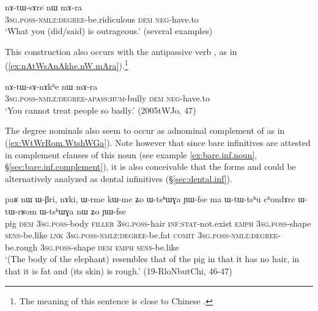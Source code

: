 \begin{exe}
\ex \label{ex:nAtWsAre.nW.mAra}
\gll  nɤ-tɯ-sɤre nɯ mɤ-ra \\
\textsc{3sg}.\textsc{poss}-\textsc{nmlz}:\textsc{degree}-be.ridiculous \textsc{dem} \textsc{neg}-have.to \\
\glt `What you (did/said) is outrageous.' (several examples)
\end{exe}

This construction also occurs with the antipassive verb , as in (\ref{ex:nAtWsAnAkhe.nW.mAra}).\footnote{The meaning of this sentence is close to Chinese .
}

\begin{exe}
\ex \label{ex:nAtWsAnAkhe.nW.mAra}
\gll nɤ-tɯ-sɤ-nɤkʰe nɯ mɤ-ra \\
\textsc{3sg}.\textsc{poss}-\textsc{nmlz}:\textsc{degree}-\textsc{apass}:\textsc{hum}-bully \textsc{dem} \textsc{neg}-have.to \\
\glt `You cannot treat people so badly.'  (2005tWJo, 47)
\end{exe}

The degree nominals also seem to occur as adnominal complement of  as in (\ref{ex:WtWrRom.WtshWGa}). Note however that since bare infinitives are attested in complement clauses of this noun (see example \ref{ex:bare.inf.noun}, §\ref{sec:bare.inf.complement}), it is also conceivable that the forms  and  could be alternatively analyzed as dental infinitives (§\ref{sec:dental.inf}).

\begin{exe}
\ex \label{ex:WtWrRom.WtshWGa}
\gll  paʁ nɯ ɯ-βri, nɤki, ɯ-rme kɯ-me ʑo ɯ-tsʰɯɣa ɲɯ-fse ma ɯ-tɯ-tsʰu cʰondɤre ɯ-tɯ-rʁom ɯ-tsʰɯɣa nɯ ʑo ɲɯ-fse \\
pig \textsc{dem} \textsc{3sg}.\textsc{poss}-body \textsc{filler} \textsc{3sg}.\textsc{poss}-hair \textsc{inf}:\textsc{stat}-not.exist \textsc{emph} \textsc{3sg}.\textsc{poss}-shape \textsc{sens}-be.like \textsc{lnk} \textsc{3sg}.\textsc{poss}-\textsc{nmlz}:\textsc{degree}-be.fat \textsc{comit} \textsc{3sg}.\textsc{poss}-\textsc{nmlz}:\textsc{degree}-be.rough \textsc{3sg}.\textsc{poss}-shape \textsc{dem} \textsc{emph} \textsc{sens}-be.like \\
\glt `(The body of the elephant) resembles that of the pig in that it has no hair, in that it is fat and (its skin) is rough.' (19-RloNbutChi, 46-47)
\end{exe}

